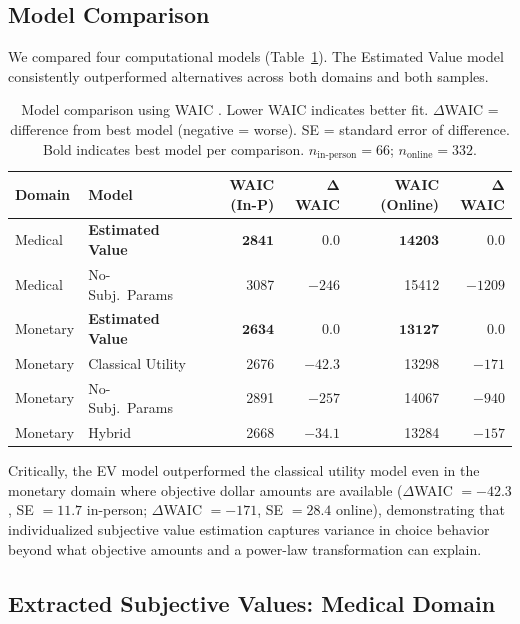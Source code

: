 \documentclass[11pt]{article}
\begin{document}
\subsection{Model Comparison}

We compared four computational models (Table~\ref{tab:model_comparison}). The Estimated Value model consistently outperformed alternatives across both domains and both samples.

\begin{table}[H]
\centering
\caption{Model comparison using WAIC \citep{watanabe2010asymptotic, vehtari2017practical}. Lower WAIC indicates better fit. $\Delta$WAIC = difference from best model (negative = worse). SE = standard error of difference. Bold indicates best model per comparison. $n_{\text{in-person}} = 66$; $n_{\text{online}} = 332$.}
\label{tab:model_comparison}
\begin{tabular}{llrrrr}
\toprule
\textbf{Domain} & \textbf{Model} & \textbf{WAIC (In-P)} & $\boldsymbol{\Delta}$\textbf{WAIC} & \textbf{WAIC (Online)} & $\boldsymbol{\Delta}$\textbf{WAIC} \\
\midrule
Medical & \textbf{Estimated Value} & $\mathbf{2841}$ & 0.0 & $\mathbf{14203}$ & 0.0 \\
Medical & No-Subj.\ Params & 3087 & $-246$ & 15412 & $-1209$ \\
\midrule
Monetary & \textbf{Estimated Value} & $\mathbf{2634}$ & 0.0 & $\mathbf{13127}$ & 0.0 \\
Monetary & Classical Utility & 2676 & $-42.3$ & 13298 & $-171$ \\
Monetary & No-Subj.\ Params & 2891 & $-257$ & 14067 & $-940$ \\
Monetary & Hybrid & 2668 & $-34.1$ & 13284 & $-157$ \\
\bottomrule
\end{tabular}
\end{table}

Critically, the EV model outperformed the classical utility model even in the monetary domain where objective dollar amounts are available ($\Delta$WAIC $= -42.3$, SE $= 11.7$ in-person; $\Delta$WAIC $= -171$, SE $= 28.4$ online), demonstrating that individualized subjective value estimation captures variance in choice behavior beyond what objective amounts and a power-law transformation can explain.

\subsection{Extracted Subjective Values: Medical Domain}
\end{document}
